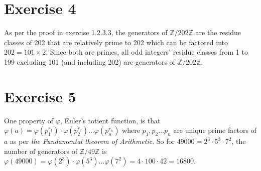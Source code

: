 \documentclass{article}
\newcommand{\Z}{\mathbb{Z}}
\begin{document}
    \section*{Exercise 4}
    As per the proof in exercise 1.2.3.3,
    the generators of $\Z/202\Z$ are the residue classes of 202
    that are relatively prime to 202
    which can be factored into $202 = 101 \times 2$.
    Since both are primes, all odd integers' residue classes
    from 1 to 199 excluding 101 (and including 202) are generators
    of $\Z/202\Z$.


    \section*{Exercise 5}
    One property of $\varphi$, Euler's totient function,
    is that $\varphi(a)
    = \varphi(p_1^{r_1}) \cdot \varphi(p_2^{r_2}) \dots \varphi(p_n^{r_n})$
    where $p_1, p_2 \dots p_n$ are unique prime factors of $a$
    as per \textit{the Fundamental theorem of Arithmetic}.
    So for $49000 = 2^3 \cdot 5^3 \cdot 7^2$,
    the number of generators of $\Z/49\Z$
    is $\varphi(49000) = \varphi(2^3) \cdot \varphi(5^3) \dots \varphi(7^2)
    = 4 \cdot 100 \cdot 42 = 16800$.
\end{document}
